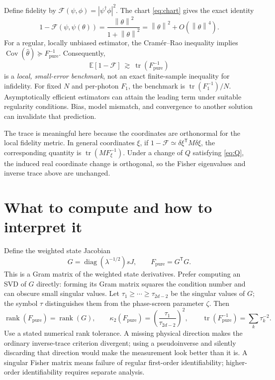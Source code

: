 \documentclass[11pt,a4paper]{article}
\newcommand{\E}{\mathbb E}
\newcommand{\tr}{\operatorname{tr}}
\newcommand{\diag}{\operatorname{diag}}
\newcommand{\rank}{\operatorname{rank}}
\newcommand{\norm}[1]{\left\lVert#1\right\rVert}
\begin{document}
Define fidelity by $\mathcal F(\psi,\phi)=|\psi^\dagger\phi|^2$.
The chart \eqref{eq:chart} gives the exact identity
\begin{equation}
 1-\mathcal F(\psi,\psi(\theta))
 =\frac{\norm{\theta}^2}{1+\norm{\theta}^2}
 =\norm{\theta}^2+O(\norm{\theta}^4).
\end{equation}
For a regular, locally unbiased estimator, the Cram\'er--Rao inequality
implies $\operatorname{Cov}(\widehat\theta)\succeq F_{\mathrm{pure}}^{-1}$.
Consequently,
\begin{equation}
 \E[1-\mathcal F]\ \gtrsim\ \tr(F_{\mathrm{pure}}^{-1})
 \label{eq:infidelity}
\end{equation}
is a \emph{local, small-error benchmark}, not an exact finite-sample
inequality for infidelity. For fixed $N$ and per-photon $F_1$, the benchmark
is $\tr(F_1^{-1})/N$. Asymptotically efficient estimators can attain the
leading term under suitable regularity conditions. Bias, model mismatch,
and convergence to another solution can invalidate that prediction.

The trace is meaningful here because the coordinates are orthonormal for
the local fidelity metric. In general coordinates $\xi$, if
$1-\mathcal F\simeq\delta\xi^{\mathsf T}M\delta\xi$, the corresponding
quantity is $\tr(MF_\xi^{-1})$. Under a change of $Q$ satisfying
\eqref{eq:Q}, the induced real coordinate change is orthogonal, so the
Fisher eigenvalues and inverse trace above are unchanged.

\section{What to compute and how to interpret it}\label{sec:diagnostics}
Define the weighted state Jacobian
\begin{equation}
 G=\diag(\lambda^{-1/2})sJ,\qquad F_{\mathrm{pure}}=G^{\mathsf T}G.
\end{equation}
This is a Gram matrix of the weighted state derivatives. Prefer computing
an SVD of $G$ directly: forming its Gram matrix squares the condition number
and can obscure small singular values. Let
$\tau_1\ge\cdots\ge\tau_{2d-2}$ be the singular values of $G$; the symbol
$\tau$ distinguishes them from the phase-screen parameter $\zeta$. Then
\begin{equation}
 \rank(F_{\mathrm{pure}})=\rank(G),\qquad
 \kappa_2(F_{\mathrm{pure}})=\left(\frac{\tau_1}{\tau_{2d-2}}\right)^2,
 \qquad \tr(F_{\mathrm{pure}}^{-1})=\sum_k\tau_k^{-2}.
\end{equation}
Use a stated numerical rank tolerance. A missing physical direction makes
the ordinary inverse-trace criterion divergent; using a pseudoinverse and
silently discarding that direction would make the measurement look better
than it is. A singular Fisher matrix means failure of regular first-order
identifiability; higher-order identifiability requires separate analysis.
\end{document}
